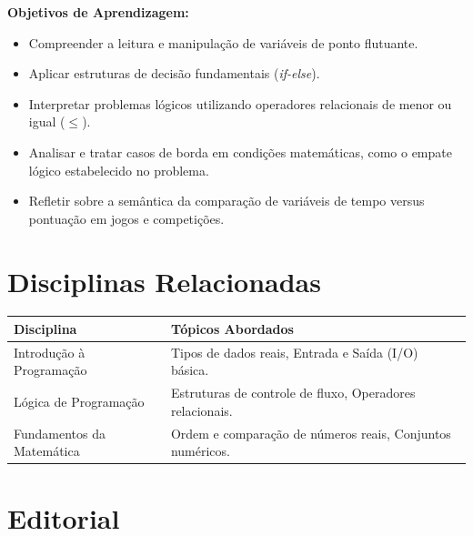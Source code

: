\documentclass[12pt]{article}
\begin{document}

\begin{objetivobox}
\textbf{Objetivos de Aprendizagem:}
\begin{itemize}
    \item Compreender a leitura e manipulação de variáveis de ponto flutuante.
    \item Aplicar estruturas de decisão fundamentais (\textit{if-else}).
    \item Interpretar problemas lógicos utilizando operadores relacionais de menor ou igual ($\leq$).
    \item Analisar e tratar casos de borda em condições matemáticas, como o empate lógico estabelecido no problema.
    \item Refletir sobre a semântica da comparação de variáveis de tempo versus pontuação em jogos e competições.
\end{itemize}
\end{objetivobox}

\section*{Disciplinas Relacionadas}
\begin{center}
\begin{tabularx}{\textwidth}{|l|X|}
\hline
\textbf{Disciplina} & \textbf{Tópicos Abordados} \\
\hline
Introdução à Programação & Tipos de dados reais, Entrada e Saída (I/O) básica. \\
\hline
Lógica de Programação & Estruturas de controle de fluxo, Operadores relacionais. \\
\hline
Fundamentos da Matemática & Ordem e comparação de números reais, Conjuntos numéricos. \\
\hline
\end{tabularx}
\end{center}


\newpage
\section*{Editorial}
\end{document}
